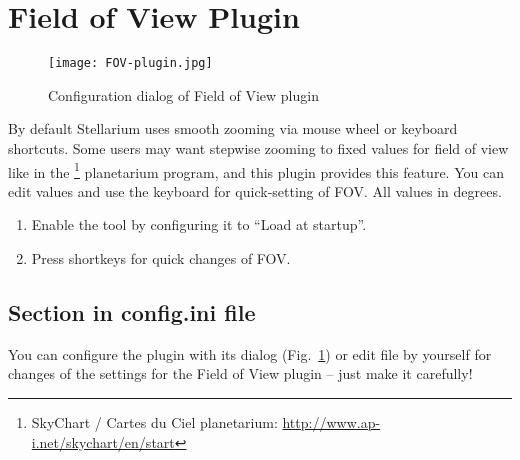 \newpage

\section{Field of View Plugin}
\label{sec:plugins:FieldOfView}

\begin{figure}[ht]\centering
\texttt{[image: FOV-plugin.jpg]}
\label{fig:plugins:FieldOfView}
\caption{Configuration dialog of Field of View plugin}
\end{figure}

\noindent By default Stellarium uses smooth zooming via mouse wheel or
keyboard shortcuts. Some users may want stepwise zooming to fixed
values for field of view like in the \footnote{SkyChart / Cartes du Ciel planetarium:
  \url{http://www.ap-i.net/skychart/en/start}} planetarium program,
and this plugin provides this feature. You can edit values and use the
keyboard for quick-setting of FOV. All values in degrees.


\begin{enumerate}
\item Enable the tool by configuring it to ``Load at startup''.
\item Press shortkeys for quick changes of FOV.
\end{enumerate}

\subsection{Section  in config.ini file}
\label{sec:plugins:FieldOfView:config}

You can configure the plugin with its dialog (Fig.~\ref{fig:plugins:FieldOfView}) or edit
 file by yourself for changes of the settings for the
Field of View plugin -- just make it carefully!

